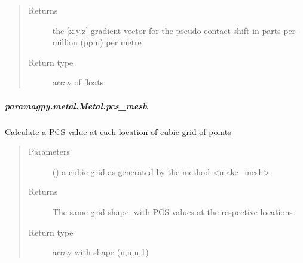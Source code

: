 \documentclass[a4paper,10pt,english,openany,oneside]{sphinxmanual}
\begin{document}
\begin{fulllineitems}
\begin{fulllineitems}
\begin{fulllineitems}
\begin{quote}
\begin{description}
\item[{Returns}] \leavevmode
{} \textendash{} the {[}x,y,z{]} gradient vector for the pseudo-contact shift
in parts-per-million (ppm) per metre

\item[{Return type}] \leavevmode
array of floats

\end{description}\end{quote}

\end{fulllineitems}



\subparagraph{paramagpy.metal.Metal.pcs\_mesh}
\label{\detokenize{reference/generated/paramagpy.metal.Metal.pcs_mesh:paramagpy-metal-metal-pcs-mesh}}\label{\detokenize{reference/generated/paramagpy.metal.Metal.pcs_mesh::doc}}

\begin{fulllineitems}
\label{\detokenize{reference/generated/paramagpy.metal.Metal.pcs_mesh:paramagpy.metal.Metal.pcs_mesh}}
Calculate a PCS value at each location of cubic grid of points
\begin{quote}\begin{description}
\item[{Parameters}] \leavevmode
{} (\sphinxstyleliteralemphasis{\sphinxupquote{ (}}\sphinxstyleliteralemphasis{\sphinxupquote{,}}\sphinxstyleliteralemphasis{\sphinxupquote{,}}\sphinxstyleliteralemphasis{\sphinxupquote{,}}\sphinxstyleliteralemphasis{\sphinxupquote{)}}) \textendash{} a cubic grid as generated by the method \textless{}make\_mesh\textgreater{}

\item[{Returns}] \leavevmode
{} \textendash{} The same grid shape, with PCS values at the respective locations

\item[{Return type}] \leavevmode
array with shape (n,n,n,1)

\end{description}\end{quote}


\end{fulllineitems}
\end{fulllineitems}
\end{fulllineitems}
\end{document}
